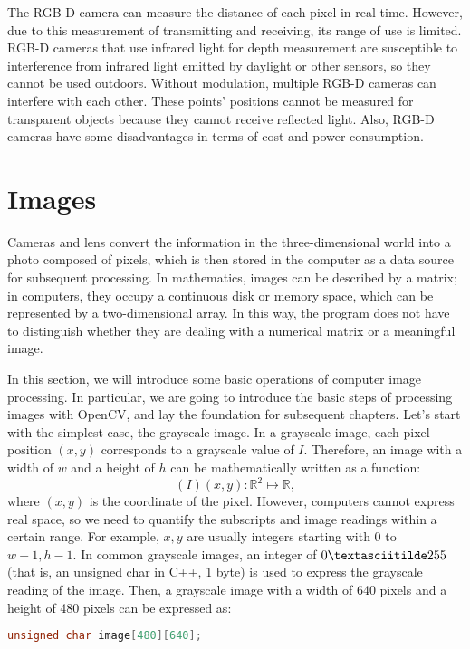 The RGB-D camera can measure the distance of each pixel in real-time. However, due to this measurement of transmitting and receiving, its range of use is limited. RGB-D cameras that use infrared light for depth measurement are susceptible to interference from infrared light emitted by daylight or other sensors, so they cannot be used outdoors. Without modulation, multiple RGB-D cameras can interfere with each other. These points' positions cannot be measured for transparent objects because they cannot receive reflected light. Also, RGB-D cameras have some disadvantages in terms of cost and power consumption.
\section{Images}
Cameras and lens convert the information in the three-dimensional world into a photo composed of pixels, which is then stored in the computer as a data source for subsequent processing. In mathematics, images can be described by a matrix; in computers, they occupy a continuous disk or memory space, which can be represented by a two-dimensional array. In this way, the program does not have to distinguish whether they are dealing with a numerical matrix or a meaningful image.

In this section, we will introduce some basic operations of computer image processing. In particular, we are going to introduce the basic steps of processing images with OpenCV, and lay the foundation for subsequent chapters. Let's start with the simplest case, the grayscale image. In a grayscale image, each pixel position $ (x, y) $ corresponds to a grayscale value of $ I $. Therefore, an image with a width of $ w $ and a height of $ h $ can be mathematically written as a function:
\[
(I) (x, y): \mathbb {R} ^ 2 \mapsto \mathbb {R},
\]
where $ (x, y) $ is the coordinate of the pixel. However, computers cannot express real space, so we need to quantify the subscripts and image readings within a certain range. For example, $ x, y $ are usually integers starting with 0 to $w-1, h-1$. In common grayscale images, an integer of $0 \textasciitilde 255$ (that is, an unsigned char in C++, 1 byte) is used to express the grayscale reading of the image. Then, a grayscale image with a width of 640 pixels and a height of 480 pixels can be expressed as:
\begin{lstlisting}[language=C++, caption=Use 2D array to express an image]
unsigned char image[480][640];
\end{lstlisting}

